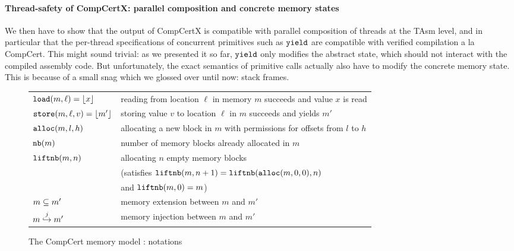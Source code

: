 \paragraph{Thread-safety of CompCertX: parallel composition and concrete memory states}

We then have to show that the output of CompCertX is compatible with
parallel composition of threads at the TAsm level, and in particular
that the per-thread specifications of concurrent primitives such as
$\yield$ are compatible with verified compilation a la CompCert.  This
might sound trivial: as we presented it so far, $\yield$ only modifies
the abstract state, which should not interact with the compiled
assembly code. But unfortunately, the exact semantics of primitive
calls actually also have to modify the concrete memory state. This is because
of a small snag which we glossed over until now: stack frames.


\begin{figure}
\begin{small}
\begin{tabular}{ll}
$\load{m}{\ell} = \some{x}$ & reading from location $\ell$ in memory $m$ succeeds and value $x$ is read \\
$\store{m}{\ell}{v} = \some{m'}$ & storing value $v$ to location $\ell$ in  $m$ succeeds and yields $m'$ \\
$\alloc{m}{l}{h}$ & allocating a new block in $m$ with permissions for offsets from $l$ to $h$ \\
$\nextblock{m}$ & number of memory blocks already allocated in $m$ \\
$\liftnextblock{m}{n}$ & allocating $n$ empty memory blocks \\
&(satisfies $\liftnextblock{m}{n+1} = \liftnextblock{\alloc{m}{0}{0}}{n}$ \\ & \quad and $\liftnextblock{m}{0} = m$) \\
$\extends{m}{m'}$ & memory extension between $m$ and $m'$ \cite[\S 5.2]{leroy08} \\
$\inject{j}{m}{m'}$ & memory injection between $m$ and $m'$ \cite[\S 5.4]{leroy08} \\
\end{tabular}
\end{small}
\caption{The CompCert memory model \cite{leroy08}: notations} \label{fig:mem}
\hrulefill
\end{figure}

